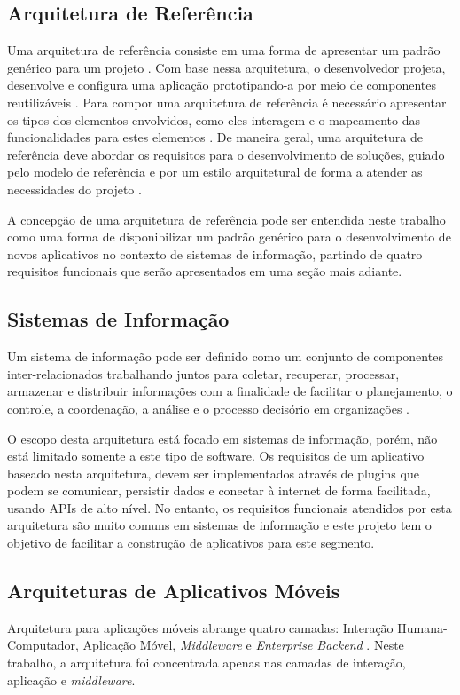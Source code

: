 \subsection{Arquitetura de Referência}
Uma arquitetura de referência consiste em uma forma de apresentar um padrão genérico para um projeto \cite{zambiasi}. Com base nessa arquitetura, o desenvolvedor projeta, desenvolve e configura uma aplicação prototipando-a por meio de componentes reutilizáveis \cite{zambiasi}. Para compor uma arquitetura de referência é necessário apresentar os tipos dos elementos envolvidos, como eles interagem e o mapeamento das funcionalidades para estes elementos \cite{Hofmeister:1999:ASA:322640}. De maneira geral, uma arquitetura de referência deve abordar os requisitos para o desenvolvimento de soluções, guiado pelo modelo de referência e por um estilo arquitetural de forma a atender as necessidades do projeto \cite{c._k_f._2006}.\par

A concepção de uma arquitetura de referência pode ser entendida neste trabalho como uma forma de disponibilizar um padrão genérico para o desenvolvimento de novos aplicativos no contexto de sistemas de informação, partindo de quatro requisitos funcionais que serão apresentados em uma seção mais adiante.\par


\subsection{Sistemas de Informação}
Um sistema de informação pode ser definido como um conjunto de componentes inter-relacionados trabalhando juntos para coletar, recuperar, processar, armazenar e distribuir informações com a finalidade de facilitar o planejamento, o controle, a coordenação, a análise e o processo decisório em organizações \cite{laudon}.\par
O escopo desta arquitetura está focado em sistemas de informação, porém, não está limitado somente a este tipo de software. Os requisitos de um aplicativo baseado nesta arquitetura, devem ser implementados através de plugins que podem se comunicar, persistir dados e conectar à internet de forma facilitada, usando APIs de alto nível. No entanto, os requisitos funcionais atendidos por esta arquitetura são muito comuns em sistemas de informação e este projeto tem o objetivo de facilitar a construção de aplicativos para este segmento.


\subsection{Arquiteturas de Aplicativos Móveis}
Arquitetura para aplicações móveis abrange quatro camadas: Interação Humana-Computador, Aplicação Móvel, \textit{Middleware} e \textit{Enterprise Backend} \cite{Pabllo:2008:MMA:1621087.1621128}. Neste trabalho, a arquitetura foi concentrada apenas nas camadas de interação, aplicação e \textit{middleware}.

